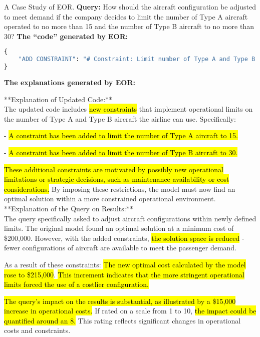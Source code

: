 \begin{figure*}[t] \small
\begin{AIbox}{A Case Study of EOR.}
{\bf Query:}
{\footnotesize
How should the aircraft configuration be adjusted to meet demand if the company decides to limit the number of Type A aircraft operated to no more than 15 and the number of Type B aircraft to no more than 30?
}
\tcbline
{\bf The ``code'' generated by EOR:}
{\footnotesize
\begin{lstlisting}[language=Python]
{
    "ADD CONSTRAINT": "# Constraint: Limit number of Type A and Type B aircraft\nm.addConstr(aircraft_count['A'] <= 15, name=\"MaxTypeAConstraint\")\nm.addConstr(aircraft_count['B'] <= 30, name=\"MaxTypeBConstraint\")"
}
\end{lstlisting}
}
\tcbline
{\bf The explanations generated by EOR:}
{\footnotesize
**Explanation of Updated Code:**\\
The updated code includes \hl{new constraints} that implement operational limits on the number of Type A and Type B aircraft the airline can use. Specifically:

\qquad- \hl{A constraint has been added to limit the number of Type A aircraft to 15.}

\qquad- \hl{A constraint has been added to limit the number of Type B aircraft to 30.}

\hl{These additional constraints are motivated by possibly new operational limitations or strategic decisions, such as maintenance availability or cost considerations.} By imposing these restrictions, the model must now find an optimal solution within a more constrained operational environment.\\

**Explanation of the Query on Results:**\\
The query specifically asked to adjust aircraft configurations within newly defined limits. The original model found an optimal solution at a minimum cost of \$200,000. However, with the added constraints, \hl{the solution space is reduced} - fewer configurations of aircraft are available to meet the passenger demand.

As a result of these constraints: \hl{The new optimal cost calculated by the model rose to \$215,000}. \hl{This increment indicates that the more stringent operational limits forced the use of a costlier configuration.}

\hl{The query's impact on the results is substantial, as illustrated by a \$15,000 increase in operational costs.} If rated on a scale from 1 to 10, \hl{the impact could be quantified around an 8.} This rating reflects significant changes in operational costs and constraints.

}
\end{AIbox}
\end{figure*}
